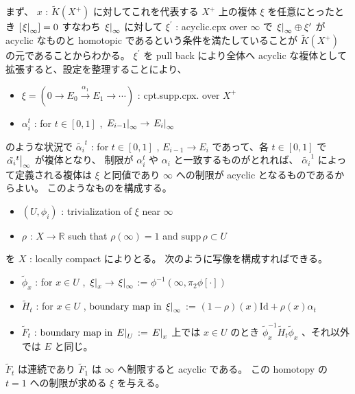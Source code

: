 \documentclass[dvipdfmx]{jsarticle}
\begin{document}
\begin{Proof}
  \itemprof
  まず、 \(x\) : \(\tilde{K}(X^+)\) に対してこれを代表する \(X^+\) 上の複体 \(\xi\) を任意にとったとき \([\left. {\xi} \right| _{\infty}] = 0\) すなわち \(\left. {\xi} \right| _{\infty}\) に対して \(\xi^\prime\) : acyclic.cpx over \(\infty\) で \(\left. {\xi} \right| _{\infty} \oplus \xi^\prime\) が acyclic なものと homotopic であるという条件を満たしていることが \(\tilde{K}(X^+)\) の元であることからわかる。
  \(\xi ^\prime\) を pull back により全体へ acyclic な複体として拡張すると、設定を整理することにより、
  \begin{itemize}
    \item \(\xi = (0 \to E_0 \overset{\alpha_1}{\to} E_1 \to \cdots)\) : cpt.supp.cpx. over \(X^+\)
    \item \(\alpha_i^t\) : for \(t \in [0,1]\) , \(\left. {E_{i-1}} \right| _{\infty} \to \left. {E_{i}} \right| _{\infty}\)
  \end{itemize}
    のような状況で \(\tilde{\alpha_i}^t\) : for \(t \in [0,1]\) , \(E_{i-1} \to E_{i}\) であって、各 \(t \in [0,1]\) で \(\left. {\tilde{\alpha_i}^t} \right| _{\infty}\) が複体となり、 制限が \(\alpha_i^t\) や \(\alpha_i\) と一致するものがとれれば、 \(\tilde{\alpha_i}^1\) によって定義される複体は \(\xi\) と同値であり \(\infty\) への制限が acyclic となるものであるからよい。
    このようなものを構成する。
  \begin{itemize}
    \item \((U, \phi_i)\) : trivialization of \(\xi\) near \(\infty\)
    \item \(\rho\) : \(X \to \mathbb{R}\) such that \(\rho(\infty) = 1\) and \(\text{supp} \, \rho \subset U\)
  \end{itemize}
  を \(X\) : locally compact によりとる。
  次のように写像を構成すればできる。
  \begin{itemize}
    \item \(\tilde{\phi}_x\) : for \(x \in U\) , \(\left. {\xi} \right| _{x} \to \left. {\xi} \right| _{\infty}\) := \(\phi^{-1}(\infty , \pi_2 \phi [\cdot])\)
    \item \(\tilde{H}_t\) : for \(x \in U\) , \(\text{boundary map in} \, \left. {\xi} \right| _{\infty}\) := \((1-\rho)(x) \text{Id} + \rho(x) \alpha_t\)
    \item \(\tilde{F}_t\) : \(\text{boundary map in} \, \left. {E} \right| _{U}\) := \(\left. {E} \right| _{x}\) 上では \(x \in U\) のとき \(\tilde{\phi}_x^{-1} \tilde{H}_t \tilde{\phi}_x\) 、それ以外では \(E\) と同じ。
\end{itemize}
\(\tilde{F}_t\) は連続であり \(\tilde{F}_1\) は \(\infty\) へ制限すると acyclic である。
この homotopy の \(t=1\) への制限が求める \(\xi\) を与える。
\end{Proof}
\end{document}
